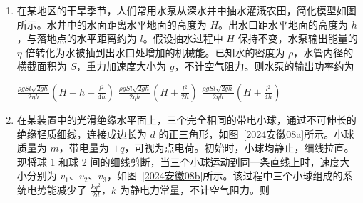 \documentclass[\gkver]{gaokaozhenti}
\begin{document}
\begin{enumerate}
{CD．小球从 P 点运动到 O 点的过程中，形变量变小，弹簧在竖直方向的合力不断变小，故小球受的合外力一直变小，加速度的最大值为撤去拉力时的加速度，由牛顿第二定律可知

$2mg = ma$

加速度的最大值为 $2g$，CD 错误。

故选 A。
}

\item
在某地区的干旱季节，人们常用水泵从深水井中抽水灌溉农田，简化模型如图所示。水井中的水面距离水平地面的高度为 $H$。出水口距水平地面的高度为 $h$，与落地点的水平距离约为 $l$。假设抽水过程中 $H$ 保持不变，水泵输出能量的 $\eta$ 倍转化为水被抽到出水口处增加的机械能。已知水的密度为 $\rho$，水管内径的横截面积为 $S$，重力加速度大小为 $g$，不计空气阻力。则水泵的输出功率约为


{$\frac{\rho gSl\sqrt{2gh}}{2\eta h}\left( H + h + \frac{l^{2}}{4h} \right)$}
{$\frac{\rho gSl\sqrt{2gh}}{2\eta h}\left( H + \frac{l^{2}}{2h} \right)$}
{$\frac{\rho gSl\sqrt{2gh}}{2\eta h}\left( H + \frac{l^{2}}{4h} \right)$}


\item
在某装置中的光滑绝缘水平面上，三个完全相同的带电小球，通过不可伸长的绝缘轻质细线，连接成边长为 $d$ 的正三角形，如图~\ref{2024安徽08a}所示。小球质量为 $m$，带电量为 $+q$，可视为点电荷。初始时，小球均静止，细线拉直。现将球 1 和球 2 间的细线剪断，当三个小球运动到同一条直线上时，速度大小分别为 $v_{1}$、$v_{2}$、$v_{3}$，如图~\ref{2024安徽08b}所示。该过程中三个小球组成的系统电势能减少了 $\frac{kq^{2}}{2d}$，$k$ 为静电力常量，不计空气阻力。则


\end{enumerate}
\end{document}

